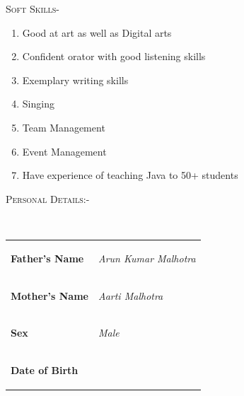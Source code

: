 \documentclass[11pt]{article}
\begin{document}
\begin{figure}[ht]
\flushleft
\noindent\colorbox{WeakOrange}
{\parbox{\dimexpr\textwidth-2\fboxsep\relax}{\textsc{Soft Skills-}}}

\begin{small}
\begin{enumerate}
\item Good at art as well as Digital arts
\item Confident orator with good listening skills
\item Exemplary writing skills
\item Singing
\item Team Management
\item Event Management
\item Have experience of teaching Java to 50+ students
\end{enumerate}
\end{small}
\noindent\colorbox{WeakOrange}
{\parbox{\dimexpr\textwidth-2\fboxsep\relax}{\textsc{Personal Details:-}}}\\
\vspace{5mm}
\begin{small}
\begin{tabular}{ |m{5.5cm} m{14cm}| }

\hline
\rowcolor{FaintOrange}
\begin{flushleft}

\textbf{{ Father's Name }}

\end{flushleft}&\begin{center}\textit{ Arun Kumar Malhotra }\end{center}\\

\begin{flushleft}
\textbf{{ Mother's Name }}

\end{flushleft}&\begin{center}\textit{ Aarti Malhotra }\end{center}\\
\rowcolor{FaintOrange}
\begin{flushleft}

\textbf{{ Sex }}

\end{flushleft}&\begin{center}\textit{ Male }\end{center}\\
\begin{flushleft}
\textbf{{ Date of Birth }}


\end{flushleft}
\end{tabular}
\end{small}
\end{figure}
\end{document}
